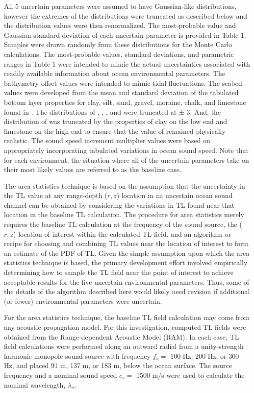 All 5 uncertain parameters were assumed to have Gaussian-like
distributions, however the extremes of the distributions were
truncated as described below and the distribution values were then
renormalized.  The most-probable value and Gaussian standard deviation
of each uncertain parameter is provided in Table 1. Samples were drawn
randomly from these distributions for the Monte Carlo calculations.
The most-probable values, standard deviations, and parametric ranges
in Table 1 were intended to mimic the actual uncertainties associated
with readily available information about ocean environmental
parameters. The bathymetry offset values were intended to mimic tidal
fluctuations. The seabed values were developed from the mean and
standard deviation of the tabulated bottom layer properties for clay,
silt, sand, gravel, moraine, chalk, and limestone found in \citet{Jensen2011}. The distributions of , , , and were truncated at ± 3.
And, the distribution of was truncated by the properties of clay on
the low end and limestone on the high end to ensure that the value of
remained physically realistic.  The sound speed increment multiplier
values were based on appropriately incorporating tabulated variations
in ocean sound speed. Note that for each environment, the situation
where all of the uncertain parameters take on their most likely values
are referred to as the baseline case.

The area statistics technique is based on the assumption that the
uncertainty in the TL value at any range-depth ($r,z$) location in an
uncertain ocean sound channel can be obtained by considering the
variations in TL found near that location in the baseline TL
calculation. The procedure for area statistics merely requires the
baseline TL calculation at the frequency of the sound source, the ($r,z$)
location of interest within the calculated TL field, and an algorithm
or recipe for choosing and combining TL values near the location of
interest to form an estimate of the PDF of TL. Given the simple
assumption upon which the area statistics technique is based, the
primary development effort involved empirically determining how to
sample the TL field near the point of interest to achieve acceptable
results for the five uncertain environmental parameters. Thus, some of
the details of the algorithm described here would likely need revision
if additional (or fewer) environmental parameters were uncertain.

For the area statistics technique, the baseline TL field calculation
may come from any acoustic propagation model. For this investigation,
computed TL fields were obtained from the Range-dependent Acoustic
Model (RAM)\citep{Collins1994}. In each case, TL field calculations were
performed along an outward radial from a unity-strength harmonic
monopole sound source with frequency $f_s=$ 100 Hz, 200 Hz, or 300 Hz, and
placed 91 m, 137 m, or 183 m, below the ocean surface. The source
frequency and a nominal sound speed $c_s=$ 1500 m/s were used to calculate
the nominal wavelength, $\lambda_s$.

